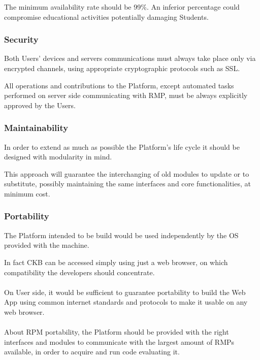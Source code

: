 The minimum availability rate should be 99\%. An inferior percentage could compromise educational activities potentially damaging Students.

\subsubsection{Security}
Both Users' devices and servers communications must always take place only via encrypted channels, using appropriate cryptographic protocols such as SSL. 

All operations and contributions to the Platform, except automated tasks performed on server side communicating with RMP, must be always explicitly approved by the Users.

\subsubsection{Maintainability}
In order to extend as much as possible the Platform's life cycle it should be designed with modularity in mind. 

This approach will guarantee the interchanging of old modules to update or to substitute, possibly maintaining the same interfaces and core functionalities, at minimum cost.

\subsubsection{Portability}
The Platform intended to be build would be used independently by the OS provided with the machine. 

In fact CKB can be accessed simply using just a web browser, on which compatibility the developers should concentrate.\\ 
\\
On User side, it would be sufficient to guarantee portability to build the Web App using common internet standards and protocols to make it usable on any web browser.\\
\\
About RPM portability, the Platform should be provided with the right interfaces and modules to communicate with the largest amount of RMPs available, in order to acquire and run code evaluating it.